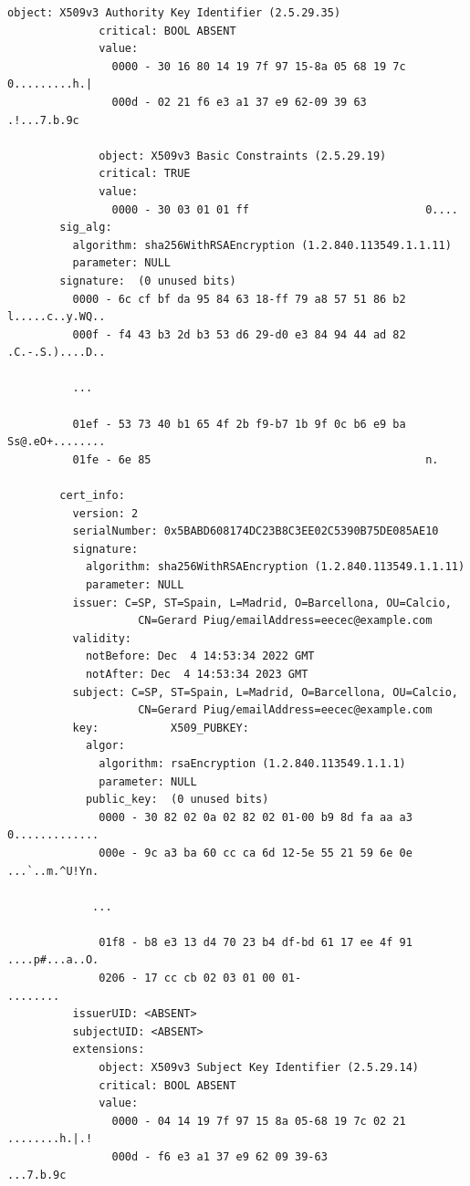 \documentclass{article}
\begin{document}
\begin{lstlisting}[basicstyle=\tiny]
              object: X509v3 Authority Key Identifier (2.5.29.35)
              critical: BOOL ABSENT
              value:
                0000 - 30 16 80 14 19 7f 97 15-8a 05 68 19 7c   0.........h.|
                000d - 02 21 f6 e3 a1 37 e9 62-09 39 63         .!...7.b.9c

              object: X509v3 Basic Constraints (2.5.29.19)
              critical: TRUE
              value:
                0000 - 30 03 01 01 ff                           0....
        sig_alg:
          algorithm: sha256WithRSAEncryption (1.2.840.113549.1.1.11)
          parameter: NULL
        signature:  (0 unused bits)
          0000 - 6c cf bf da 95 84 63 18-ff 79 a8 57 51 86 b2   l.....c..y.WQ..
          000f - f4 43 b3 2d b3 53 d6 29-d0 e3 84 94 44 ad 82   .C.-.S.)....D..

          ... 

          01ef - 53 73 40 b1 65 4f 2b f9-b7 1b 9f 0c b6 e9 ba   Ss@.eO+........
          01fe - 6e 85                                          n.

        cert_info:
          version: 2
          serialNumber: 0x5BABD608174DC23B8C3EE02C5390B75DE085AE10
          signature:
            algorithm: sha256WithRSAEncryption (1.2.840.113549.1.1.11)
            parameter: NULL
          issuer: C=SP, ST=Spain, L=Madrid, O=Barcellona, OU=Calcio, 
                    CN=Gerard Piug/emailAddress=eecec@example.com
          validity:
            notBefore: Dec  4 14:53:34 2022 GMT
            notAfter: Dec  4 14:53:34 2023 GMT
          subject: C=SP, ST=Spain, L=Madrid, O=Barcellona, OU=Calcio, 
                    CN=Gerard Piug/emailAddress=eecec@example.com
          key:           X509_PUBKEY:
            algor:
              algorithm: rsaEncryption (1.2.840.113549.1.1.1)
              parameter: NULL
            public_key:  (0 unused bits)
              0000 - 30 82 02 0a 02 82 02 01-00 b9 8d fa aa a3   0.............
              000e - 9c a3 ba 60 cc ca 6d 12-5e 55 21 59 6e 0e   ...`..m.^U!Yn.

             ... 

              01f8 - b8 e3 13 d4 70 23 b4 df-bd 61 17 ee 4f 91   ....p#...a..O.
              0206 - 17 cc cb 02 03 01 00 01-                    ........
          issuerUID: <ABSENT>
          subjectUID: <ABSENT>
          extensions:
              object: X509v3 Subject Key Identifier (2.5.29.14)
              critical: BOOL ABSENT
              value:
                0000 - 04 14 19 7f 97 15 8a 05-68 19 7c 02 21   ........h.|.!
                000d - f6 e3 a1 37 e9 62 09 39-63               ...7.b.9c


\end{lstlisting}
\end{document}
